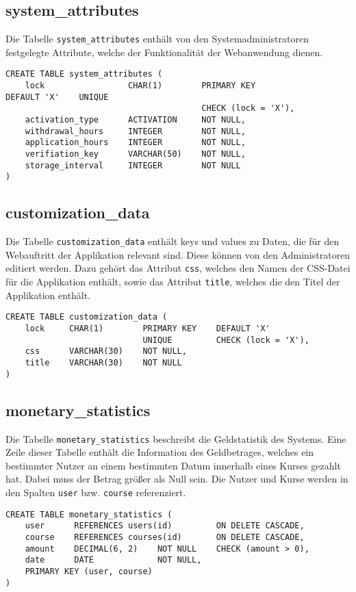 \subsection{system\_attributes}
Die Tabelle \texttt{system\_attributes} enthält von den Systemadministratoren festgelegte Attribute, welche der Funktionalität der Webanwendung dienen.

\begin{verbatim}
CREATE TABLE system_attributes (
    lock                 CHAR(1)        PRIMARY KEY    									 DEFAULT 'X'    UNIQUE
                                        CHECK (lock = 'X'),
    activation_type      ACTIVATION     NOT NULL,
    withdrawal_hours     INTEGER        NOT NULL,
    application_hours    INTEGER        NOT NULL,
    verifiation_key      VARCHAR(50)    NOT NULL,
    storage_interval     INTEGER        NOT NULL
)
\end{verbatim}

\subsection{customization\_data}
Die Tabelle \texttt{customization\_data} enthält keys und values zu Daten, die für den Webauftritt der Applikation relevant sind. Diese können von den Administratoren editiert werden. Dazu gehört das Attribut \texttt{css}, welches den Namen der CSS-Datei für die Applikation enthält, sowie das Attribut \texttt{title}, welches die den Titel der Applikation enthält.

\begin{verbatim}
CREATE TABLE customization_data (
    lock     CHAR(1)        PRIMARY KEY    DEFAULT 'X'
                            UNIQUE         CHECK (lock = 'X'),
    css      VARCHAR(30)    NOT NULL,
    title    VARCHAR(30)    NOT NULL
)
\end{verbatim}

\subsection{monetary\_statistics}
Die Tabelle \texttt{monetary\_statistics} beschreibt die Geldstatistik des Systems. Eine Zeile dieser Tabelle enthält die Information des Geldbetrages, welches ein bestimmter Nutzer an einem bestimmten Datum innerhalb eines Kurses gezahlt hat. Dabei muss der Betrag größer als Null sein. Die Nutzer und Kurse werden in den Spalten \texttt{user} bzw. \texttt{course} referenziert.

\begin{verbatim}
CREATE TABLE monetary_statistics (
    user      REFERENCES users(id)         ON DELETE CASCADE,
    course    REFERENCES courses(id)       ON DELETE CASCADE,
    amount    DECIMAL(6, 2)    NOT NULL    CHECK (amount > 0),
    date      DATE             NOT NULL,
    PRIMARY KEY (user, course)
)
\end{verbatim}

